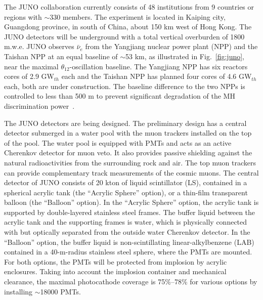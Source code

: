The JUNO collaboration currently consists of 48 institutions from 9 countries or regions with $\sim$330 members.
The experiment is located in Kaiping city, Guangdong province, in south of China, about 150 km west of Hong Kong. The JUNO detectors will be underground with a total vertical overburden of 1800 m.w.e. JUNO observes $\bar\nu_e$ from the Yangjiang nuclear power plant (NPP) and the Taishan NPP at an equal baseline of $\sim$53 km, as illustrated in Fig.~\ref{fig:juno}, near the maximal $\theta_{12}$-oscillation baseline. The Yangjiang NPP has six reactors cores of 2.9 GW$_{th}$ each and the Taishan NPP has planned four cores of 4.6 GW$_{th}$ each, both are under construction. The baseline difference to the two NPPs is controlled to less than 500 m to prevent significant degradation of the MH discrimination power~\cite{Li-PRD13}.

The JUNO detectors are being designed. The preliminary design has a central detector submerged in a water pool with the muon trackers installed on the top of the pool. 
The water pool is equipped with PMTs and acts as an active Cherenkov detector for muon veto. 
It also provides passive shielding against the natural radioactivities from the surrounding rock and air. 
The top muon trackers can provide complementary track measurements of the cosmic muons. 
The central detector of JUNO consists of 20 kton of liquid scintillator (LS), contained in a spherical acrylic tank (the ``Acrylic Sphere'' option), or a thin-film transparent balloon (the ``Balloon'' option). 
In the ``Acrylic Sphere'' option, the acrylic tank is supported by double-layered stainless steel frames. 
The buffer liquid between the acrylic tank and the supporting frames is water, which is physically connected with but optically separated from the outside water Cherenkov detector. 
In the ``Balloon'' option, the buffer liquid is non-scintillating linear-alkylbenzene (LAB) contained in a 40-m-radius stainless steel sphere, where the PMTs are mounted. 
For both options, the PMTs will be protected from implosion by acrylic enclosures. 
Taking into account the implosion container and mechanical clearance, the maximal photocathode coverage is 75\%--78\% for various options by installing $\sim$18000 PMTs.

